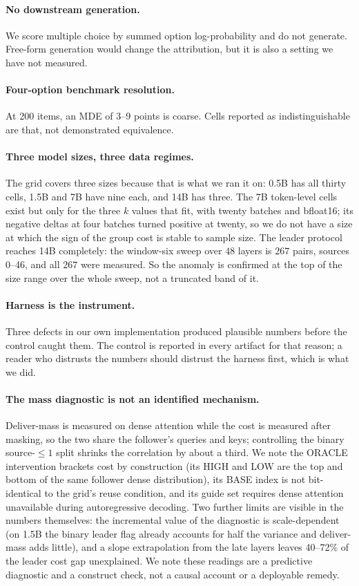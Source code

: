 \documentclass[10pt]{article}
\begin{document}
\paragraph{No downstream generation.} We score multiple choice by summed
option log-probability and do not generate. Free-form generation would change
the attribution, but it is also a setting we have not measured.

\paragraph{Four-option benchmark resolution.} At 200 items, an MDE of 3--9
points is coarse. Cells reported as indistinguishable are that, not
demonstrated equivalence.

\paragraph{Three model sizes, three data regimes.} The grid covers three
sizes because that is what we ran it on: 0.5B has all thirty cells, 1.5B and
7B have nine each, and 14B has three. The 7B token-level cells exist but only
for the three $k$ values that fit, with twenty batches and bfloat16; its
negative deltas at four batches turned positive at twenty, so we do not have a
size at which the sign of the group cost is stable to sample size. The leader
protocol reaches 14B completely: the window-six sweep over $48$ layers is
$267$ pairs, sources 0--46, and all $267$ were measured. So the anomaly is
confirmed at the top of the size range over the whole sweep, not a truncated
band of it.

\paragraph{Harness is the instrument.} Three defects in our own implementation
produced plausible numbers before the control caught them. The control is
reported in every artifact for that reason; a reader who distrusts the
numbers should distrust the harness first, which is what we did.

\paragraph{The mass diagnostic is not an identified mechanism.} Deliver-mass
is measured on dense attention while the cost is measured after masking, so
the two share the follower's queries and keys; controlling the binary
source-$\le 1$ split shrinks the correlation by about a third. We note the ORACLE
intervention brackets cost by construction (its HIGH and LOW are the top and
bottom of the same follower dense distribution), its BASE index is not
bit-identical to the grid's reuse condition, and its guide set requires dense
attention unavailable during autoregressive decoding. Two further limits are
visible in the numbers themselves: the incremental value of the diagnostic is
scale-dependent (on 1.5B the binary leader flag already accounts for half the
variance and deliver-mass adds little), and a slope extrapolation from the late
layers leaves 40--72\% of the leader cost gap unexplained. We note these
readings are a predictive diagnostic and a construct check, not a causal
account or a deployable remedy.
\end{document}
